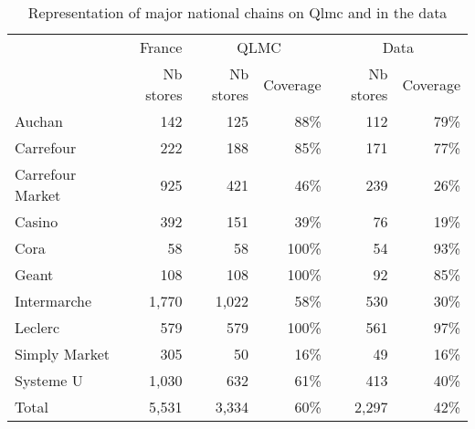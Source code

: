 \documentclass[english]{article}
\begin{document}
\begin{table}
\caption{Representation of major national chains on Qlmc and in the data}
\label{tab:qlmc_chain_repr}
\begin{threeparttable}
\begin{tabular}{lr|rr|rr}
\toprule
\toprule
          & France & \multicolumn{2}{c|}{QLMC} & \multicolumn{2}{c}{Data} \\
          & Nb stores & Nb stores & Coverage & Nb stores & Coverage \\
\midrule
    Auchan & 142   & 125   & 88\%  & 112   & 79\% \\
    Carrefour & 222   & 188   & 85\%  & 171   & 77\% \\
    Carrefour Market & 925   & 421   & 46\%  & 239   & 26\% \\
    Casino & 392   & 151   & 39\%  & 76    & 19\% \\
    Cora  & 58    & 58    & 100\% & 54    & 93\% \\
    Geant & 108   & 108   & 100\% & 92    & 85\% \\
    Intermarche & 1,770 & 1,022 & 58\%  & 530   & 30\% \\
    Leclerc & 579   & 579   & 100\% & 561   & 97\% \\
    Simply Market & 305   & 50    & 16\%  & 49    & 16\% \\
    Systeme U & 1,030 & 632   & 61\%  & 413   & 40\% \\
\midrule		
    Total & 5,531 & 3,334 & 60\%  & 2,297 & 42\% \\
\bottomrule
\bottomrule
\end{tabular}
\end{threeparttable}
\end{table}
\end{document}
